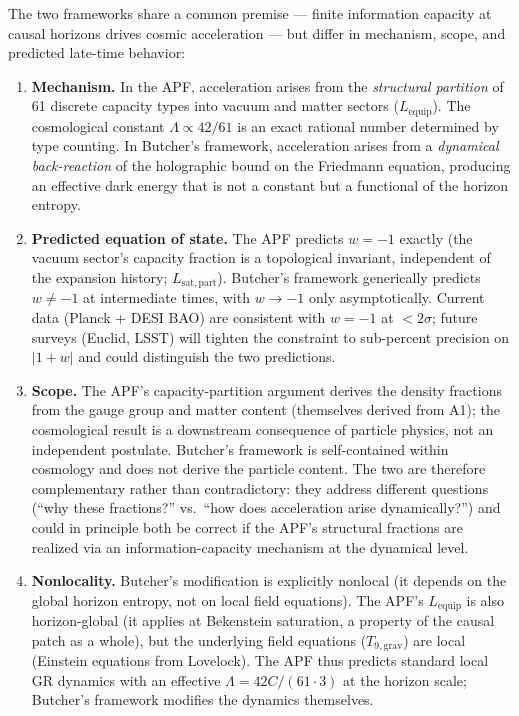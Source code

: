 \documentclass[11pt,a4paper]{article}
\theoremstyle{definition}
\begin{document}
The two frameworks share a common premise --- finite information capacity
at causal horizons drives cosmic acceleration --- but differ in mechanism,
scope, and predicted late-time behavior:
\begin{enumerate}[label=(\alph*),nosep]
  \item \textbf{Mechanism.}\quad
  In the APF, acceleration arises from the \emph{structural partition}
  of 61 discrete capacity types into vacuum and matter sectors
  ($L_{\mathrm{equip}}$).  The cosmological constant
  $\Lambda \propto 42/61$ is an exact rational number determined by
  type counting.  In Butcher's framework, acceleration arises from a
  \emph{dynamical back-reaction} of the holographic bound on the
  Friedmann equation, producing an effective dark energy that is not
  a constant but a functional of the horizon entropy.
  \item \textbf{Predicted equation of state.}\quad
  The APF predicts $w = -1$ exactly (the vacuum sector's capacity
  fraction is a topological invariant, independent of the expansion
  history; $L_{\mathrm{sat,part}}$).  Butcher's framework generically
  predicts $w \ne -1$ at intermediate times, with $w \to -1$ only
  asymptotically.  Current data (Planck + DESI BAO) are consistent
  with $w = -1$ at $< 2\sigma$; future surveys (Euclid, LSST) will
  tighten the constraint to sub-percent precision on $|1 + w|$ and
  could distinguish the two predictions.
  \item \textbf{Scope.}\quad
  The APF's capacity-partition argument derives the density fractions
  from the gauge group and matter content (themselves derived from A1);
  the cosmological result is a downstream consequence of particle
  physics, not an independent postulate.  Butcher's framework is
  self-contained within cosmology and does not derive the particle
  content.  The two are therefore complementary rather than
  contradictory: they address different questions (``why these
  fractions?'' vs.\ ``how does acceleration arise dynamically?'')
  and could in principle both be correct if the APF's structural
  fractions are realized via an information-capacity mechanism at the
  dynamical level.
  \item \textbf{Nonlocality.}\quad
  Butcher's modification is explicitly nonlocal (it depends on the
  global horizon entropy, not on local field equations).  The APF's
  $L_{\mathrm{equip}}$ is also horizon-global (it applies at Bekenstein
  saturation, a property of the causal patch as a whole), but the
  underlying field equations ($T_{9,\mathrm{grav}}$) are local (Einstein
  equations from Lovelock).  The APF thus predicts standard local GR
  dynamics with an effective $\Lambda = 42 C / (61 \cdot 3)$
  at the horizon scale; Butcher's framework modifies the dynamics
  themselves.
\end{enumerate}
\end{document}
